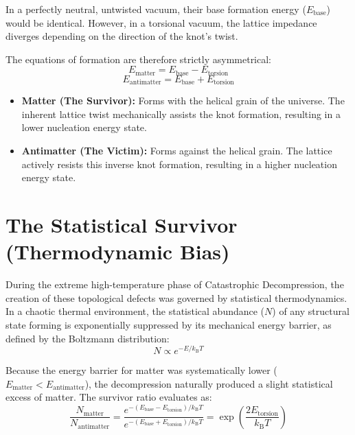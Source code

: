 In a perfectly neutral, untwisted vacuum, their base formation energy ($E_{\mathrm{base}}$) would be identical. However, in a torsional vacuum, the lattice impedance diverges depending on the direction of the knot's twist.

The equations of formation are therefore strictly asymmetrical:
\begin{equation}
    E_{\mathrm{matter}} = E_{\mathrm{base}} - E_{\mathrm{torsion}}
\end{equation}
\begin{equation}
    E_{\mathrm{antimatter}} = E_{\mathrm{base}} + E_{\mathrm{torsion}}
\end{equation}

\begin{itemize}
    \item \textbf{Matter (The Survivor):} Forms with the helical grain of the universe. The inherent lattice twist mechanically assists the knot formation, resulting in a lower nucleation energy state.
    \item \textbf{Antimatter (The Victim):} Forms against the helical grain. The lattice actively resists this inverse knot formation, resulting in a higher nucleation energy state.
\end{itemize}

\section{The Statistical Survivor (Thermodynamic Bias)}
During the extreme high-temperature phase of Catastrophic Decompression, the creation of these topological defects was governed by statistical thermodynamics. In a chaotic thermal environment, the statistical abundance ($N$) of any structural state forming is exponentially suppressed by its mechanical energy barrier, as defined by the Boltzmann distribution:
\begin{equation}
    N \propto e^{-E / k_{\mathrm{B}} T}
\end{equation}

Because the energy barrier for matter was systematically lower ($E_{\mathrm{matter}} < E_{\mathrm{antimatter}}$), the decompression naturally produced a slight statistical excess of matter. The survivor ratio evaluates as:
\begin{equation}
    \frac{N_{\mathrm{matter}}}{N_{\mathrm{antimatter}}} = \frac{e^{-(E_{\mathrm{base}} - E_{\mathrm{torsion}}) / k_{\mathrm{B}} T}}{e^{-(E_{\mathrm{base}} + E_{\mathrm{torsion}}) / k_{\mathrm{B}} T}} = \exp\left( \frac{2E_{\mathrm{torsion}}}{k_{\mathrm{B}} T} \right)
\end{equation}

